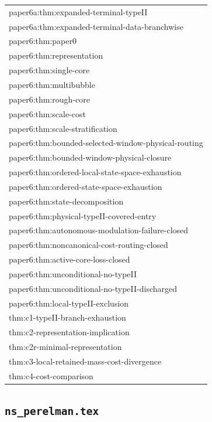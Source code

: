\documentclass[11pt]{amsart}
\begin{document}
\begin{longtable}{@{}>{\ttfamily\footnotesize\raggedright\arraybackslash}p{}@{}}
paper6a:thm:expanded-terminal-typeII\\
paper6a:thm:expanded-terminal-data-branchwise\\
paper6:thm:paper0\\
paper6:thm:representation\\
paper6:thm:single-core\\
paper6:thm:multibubble\\
paper6:thm:rough-core\\
paper6:thm:scale-cost\\
paper6:thm:scale-stratification\\
paper6:thm:bounded-selected-window-physical-routing\\
paper6:thm:bounded-window-physical-closure\\
paper6:thm:ordered-local-state-space-exhaustion\\
paper6:thm:ordered-state-space-exhaustion\\
paper6:thm:state-decomposition\\
paper6:thm:physical-typeII-covered-entry\\
paper6:thm:autonomous-modulation-failure-closed\\
paper6:thm:noncanonical-cost-routing-closed\\
paper6:thm:active-core-loss-closed\\
paper6:thm:unconditional-no-typeII\\
paper6:thm:unconditional-no-typeII-discharged\\
paper6:thm:local-typeII-exclusion\\
thm:c1-typeII-branch-exhaustion\\
thm:c2-representation-implication\\
thm:c2r-minimal-representation\\
thm:c3-local-retained-mass-cost-divergence\\
thm:c4-cost-comparison\\
\bottomrule
\end{longtable}

\subsection{\texorpdfstring{\texttt{ns\_perelman.tex}}{ns perelman.tex}}
\end{document}
